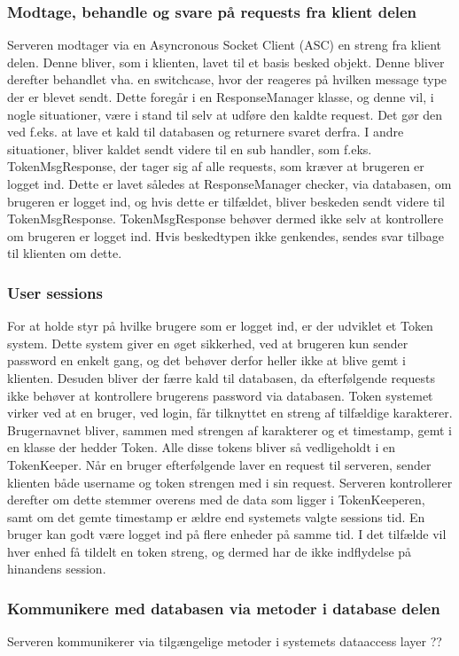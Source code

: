 \subsubsection{Modtage, behandle og svare på requests fra klient delen}
Serveren modtager via en Asyncronous Socket Client (ASC) en streng fra klient delen. Denne bliver, som i klienten, lavet til et basis besked objekt. Denne bliver derefter behandlet vha. en switchcase, hvor der reageres på hvilken message type der er blevet sendt. Dette foregår i en ResponseManager klasse, og denne vil, i nogle situationer, være i stand til selv at udføre den kaldte request. Det gør den ved f.eks. at lave et kald til databasen og returnere svaret derfra. 
I andre situationer, bliver kaldet sendt videre til en sub handler, som f.eks. TokenMsgResponse, der tager sig af alle requests, som kræver at brugeren er logget ind. Dette er lavet således at ResponseManager checker, via databasen, om brugeren er logget ind, og hvis dette er tilfældet, bliver beskeden sendt videre til TokenMsgResponse. TokenMsgResponse behøver dermed ikke selv at kontrollere om brugeren er logget ind.
Hvis beskedtypen ikke genkendes, sendes svar tilbage til klienten om dette.

\subsubsection{User sessions}
For at holde styr på hvilke brugere som er logget ind, er der udviklet et Token system. Dette system giver en øget sikkerhed, ved at brugeren kun sender password en enkelt gang, og det behøver derfor heller ikke at blive gemt i klienten. Desuden bliver der færre kald til databasen, da efterfølgende requests ikke behøver at kontrollere brugerens password via databasen.
Token systemet virker ved at en bruger, ved login, får tilknyttet en streng af tilfældige karakterer. Brugernavnet bliver, sammen med strengen af karakterer og et timestamp, gemt i en klasse der hedder Token. Alle disse tokens bliver så vedligeholdt i en TokenKeeper. Når en bruger efterfølgende laver en request til serveren, sender klienten både username og token strengen med i sin request. Serveren kontrollerer derefter om dette stemmer overens med de data som ligger i TokenKeeperen, samt om det gemte timestamp er ældre end systemets valgte sessions tid.
En bruger kan godt være logget ind på flere enheder på samme tid. I det tilfælde vil hver enhed få tildelt en token streng, og dermed har de ikke indflydelse på hinandens session.

\subsubsection{Kommunikere med databasen via metoder i database delen}
Serveren kommunikerer via tilgængelige metoder i systemets dataaccess layer ??

